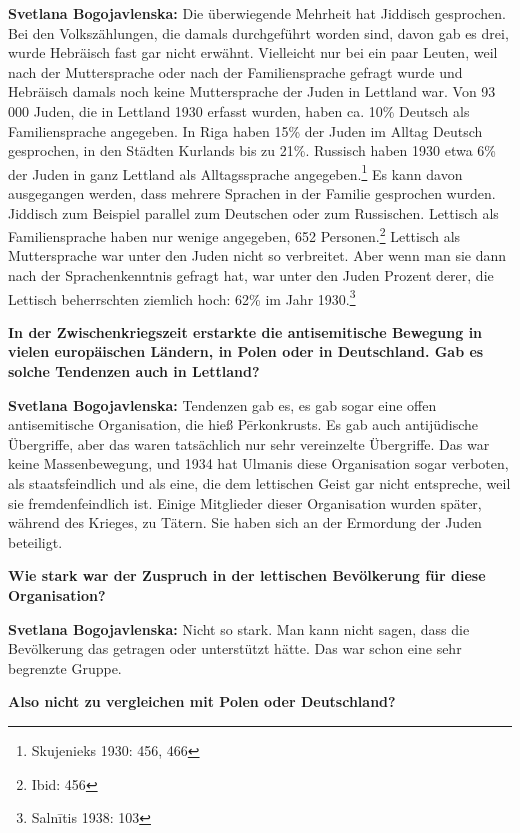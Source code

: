 \textbf{Svetlana Bogojavlenska:} Die überwiegende Mehrheit hat Jiddisch gesprochen. Bei den Volkszählungen, die damals durchgeführt worden sind, davon gab es drei, wurde Hebräisch fast gar nicht erwähnt. Vielleicht nur bei ein paar Leuten, weil nach der Muttersprache oder nach der Familiensprache gefragt wurde und Hebräisch damals noch keine Muttersprache der Juden in Lettland war.
Von 93 000 Juden, die in Lettland 1930 erfasst wurden, haben ca. 10\% Deutsch als Familiensprache angegeben. In Riga haben 15\% der Juden im Alltag Deutsch gesprochen, in den Städten Kurlands bis zu 21\%. Russisch haben 1930 etwa 6\% der Juden in ganz Lettland als Alltagssprache angegeben.\footnote{Skujenieks 1930: 456, 466}  Es kann davon ausgegangen werden, dass mehrere Sprachen in der Familie gesprochen wurden. Jiddisch zum Beispiel parallel zum Deutschen oder zum Russischen. 
Lettisch als Familiensprache haben nur wenige angegeben, 652 Personen.\footnote{Ibid: 456}  Lettisch als Muttersprache war unter den Juden nicht so verbreitet. Aber wenn man sie dann nach der Sprachenkenntnis gefragt hat, war unter den Juden Prozent derer, die Lettisch beherrschten ziemlich hoch: 62\% im Jahr 1930.\footnote{Salnītis 1938: 103}

\textbf{In der Zwischenkriegszeit erstarkte die antisemitische Bewegung in vielen europäischen Ländern, in Polen oder in Deutschland. Gab es solche Tendenzen auch in Lettland?}

\textbf{Svetlana Bogojavlenska:} Tendenzen gab es, es gab sogar eine offen antisemitische Organisation, die hieß Pērkonkrusts. Es gab auch antijüdische Übergriffe, aber das waren tatsächlich nur sehr vereinzelte Übergriffe. Das war keine Massenbewegung, und 1934 hat Ulmanis diese Organisation sogar verboten, als staatsfeindlich und als eine, die dem lettischen Geist gar nicht entspreche, weil sie fremdenfeindlich ist. Einige Mitglieder dieser Organisation wurden später, während des Krieges, zu Tätern. Sie haben sich an der Ermordung der Juden beteiligt.

\textbf{Wie stark war der Zuspruch in der lettischen Bevölkerung für diese Organisation?}

\textbf{Svetlana Bogojavlenska:} Nicht so stark. Man kann nicht sagen, dass die Bevölkerung das getragen oder unterstützt hätte. Das war schon eine sehr begrenzte Gruppe.
 
\textbf{Also nicht zu vergleichen mit Polen oder Deutschland?}

